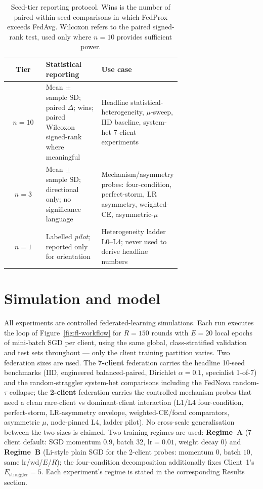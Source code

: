 \documentclass[11pt,a4paper]{report}
\begin{document}
\begin{table}[H]
\centering
\small
\caption{Seed-tier reporting protocol. Wins is the number of paired
within-seed comparisons in which FedProx exceeds FedAvg. Wilcoxon refers
to the paired signed-rank test, used only where $n = 10$ provides
sufficient power.}
\label{tab:seed-tiers}
\begin{tabular}{c p{0.32\linewidth} p{0.36\linewidth}}
\toprule
Tier         & Statistical reporting                                                                            & Use case                                                                                                  \\
\midrule
$n = 10$     & Mean $\pm$ sample SD; paired $\Delta$; wins; paired Wilcoxon signed-rank where meaningful        & Headline statistical-heterogeneity, $\mu$-sweep, IID baseline, system-het 7-client experiments            \\
$n = 3$      & Mean $\pm$ sample SD; directional only; no significance language                                & Mechanism/asymmetry probes: four-condition, perfect-storm, LR asymmetry, weighted-CE, asymmetric-$\mu$    \\
$n = 1$      & Labelled \emph{pilot}; reported only for orientation                                            & Heterogeneity ladder L0--L4; never used to derive headline numbers                                        \\
\bottomrule
\end{tabular}
\end{table}

\section{Simulation and model}
\label{sec:method-simulation}

All experiments are controlled federated-learning simulations. Each run executes the loop of Figure~\ref{fig:fl-workflow} for $R = 150$ rounds
with $E = 20$ local epochs of mini-batch SGD per client, using the same global,
class-stratified validation and test sets throughout --- only the client training
partition varies. Two federation sizes are used. The \textbf{7-client} federation
carries the headline 10-seed benchmarks (IID, engineered balanced-paired,
Dirichlet $\alpha = 0.1$, specialist 1-of-7) and the random-straggler system-het
comparisons including the FedNova random-$\tau$ collapse; the \textbf{2-client}
federation carries the controlled mechanism probes that need a clean rare-client
vs dominant-client interaction (L1/L4 four-condition, perfect-storm, LR-asymmetry
envelope, weighted-CE/focal comparators, asymmetric $\mu$, node-pinned L4, ladder
pilot). No cross-scale generalisation between the two sizes is claimed. Two
training regimes are used: \textbf{Regime~A} (7-client default: SGD momentum
$0.9$, batch $32$, $\textrm{lr} = 0.01$, weight decay $0$) and \textbf{Regime~B}
(Li-style plain SGD for the 2-client probes: momentum $0$, batch $10$, same
lr/wd/$E$/$R$); the four-condition decomposition additionally fixes Client~1's
$E_{\textrm{straggler}} = 5$. Each experiment's regime is stated in the
corresponding Results section.
\end{document}
